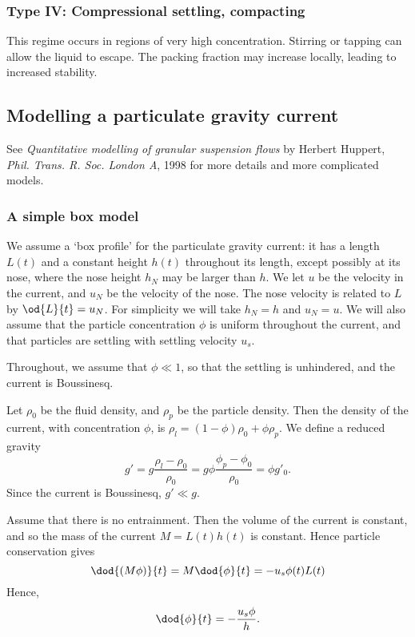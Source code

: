 \subsubsection{Type IV: Compressional settling, compacting}

This regime occurs in regions of very high concentration. Stirring or tapping can allow the liquid to escape. The packing fraction may increase locally, leading to increased stability.  

\subsection{Modelling a particulate gravity current}


See \textit{Quantitative modelling of granular suspension flows} by Herbert Huppert, \textit{Phil. Trans. R. Soc. London A}, 1998 for more details and more complicated models. 

\subsubsection{A simple box model}
We assume a `box profile' for the particulate gravity current: it has a length $L(t)$ and a constant height $h(t)$ throughout its length, except possibly at its nose, where the nose height $h_N$ may be larger than $h$. We let $u$ be the velocity in the current, and $u_N$ be the velocity of the nose. The nose velocity is related to $L$ by $\od{L}{t} = u_N$. For simplicity we will take $h_N = h$ and $u_N = u$. We will also assume that the particle concentration $\phi$ is uniform throughout the current, and that particles are settling with settling velocity $u_s$.  

Throughout, we assume that $\phi\ll1$, so that the settling is unhindered, and the current is Boussinesq. 

Let $\rho_0$ be the fluid density, and $\rho_p$ be the particle density. Then the density of the current, with concentration $\phi$, is $\rho_l = (1-\phi)\rho_0 + \phi \rho_p$. We define a reduced gravity
\begin{equation}
g' = g \frac{\rho_l - \rho_0}{\rho_0} = g\phi\frac{\phi_p - \phi_0}{\rho_0} = \phi g'_0.
\end{equation} 
Since the current is Boussinesq, $g' \ll g$. 

Assume that there is no entrainment. Then the volume of the current is constant, and so the mass of the current $M = L(t)h(t)$ is constant. Hence particle conservation gives
\begin{equation}
\dod{(M\phi)}{t} = M\dod{\phi}{t} = -u_s \phi(t) L(t)
\end{equation}
Hence,
\begin{equation}
\dod{\phi}{t} = -\frac{u_s \phi}{h}.
\end{equation}

